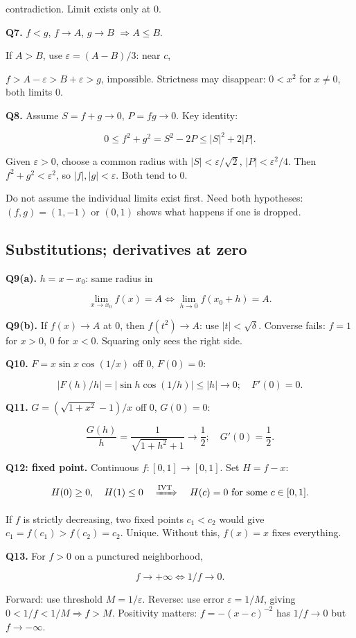 \documentclass[11pt,a4paper]{article}
\begin{document}
contradiction. Limit exists only at \(0\).

\textbf{Q7.} \(f<g\), \(f\to A\), \(g\to B\) \(\Rightarrow A\le B\).

If \(A>B\), use \(\varepsilon=(A-B)/3\): near \(c\),

\(f>A-\varepsilon>B+\varepsilon>g\), impossible. Strictness may
disappear: \(0<x^2\) for \(x\ne0\), both limits \(0\).

\textbf{Q8.} Assume \(S=f+g\to0\), \(P=fg\to0\). Key identity:

\[
0\le f^2+g^2=S^2-2P\le|S|^2+2|P|.
\]

Given \(\varepsilon>0\), choose a common radius with
\(|S|<\varepsilon/\sqrt2\), \(|P|<\varepsilon^2/4\). Then
\(f^2+g^2<\varepsilon^2\), so \(|f|,|g|<\varepsilon\). Both tend to
\(0\).

Do not assume the individual limits exist first. Need both hypotheses:
\((f,g)=(1,-1)\) or \((0,1)\) shows what happens if one is dropped.

\subsection{Substitutions; derivatives at
zero}\label{substitutions-derivatives-at-zero}

\textbf{Q9(a).} \(h=x-x_0\): same radius in

\[
\lim_{x\to x_0}f(x)=A\iff\lim_{h\to0}f(x_0+h)=A.
\]

\textbf{Q9(b).} If \(f(x)\to A\) at \(0\), then \(f(t^2)\to A\): use
\(|t|<\sqrt\delta\). Converse fails: \(f=1\) for \(x>0\), \(0\) for
\(x<0\). Squaring only sees the right side.

\textbf{Q10.} \(F=x\sin x\cos(1/x)\) off \(0\), \(F(0)=0\):

\[
|F(h)/h|=|\sin h\cos(1/h)|\le|h|\to0;\quad F'(0)=0.
\]

\textbf{Q11.} \(G=(\sqrt{1+x^2}-1)/x\) off \(0\), \(G(0)=0\):

\[
\frac{G(h)}h=\frac1{\sqrt{1+h^2}+1}\to\frac12;\quad G'(0)=\frac12.
\]

\textbf{Q12: fixed point.} Continuous \(f:[0,1]\to[0,1]\). Set
\(H=f-x\):

\[
H(0)\ge0,\quad H(1)\le0\quad\xRightarrow{\mathrm{IVT}}\quad
H(c)=0\text{ for some }c\in[0,1].
\]

If \(f\) is strictly decreasing, two fixed points \(c_1<c_2\) would give
\(c_1=f(c_1)>f(c_2)=c_2\). Unique. Without this, \(f(x)=x\) fixes
everything.

\textbf{Q13.} For \(f>0\) on a punctured neighborhood,

\[
f\to+\infty\iff1/f\to0.
\]

Forward: use threshold \(M=1/\varepsilon\). Reverse: use error
\(\varepsilon=1/M\), giving \(0<1/f<1/M\Rightarrow f>M\). Positivity
matters: \(f=-(x-c)^{-2}\) has \(1/f\to0\) but \(f\to-\infty\).
\end{document}
